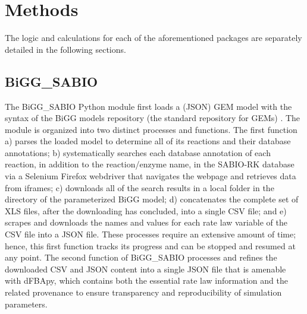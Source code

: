\section{Methods}
The logic and calculations for each of the aforementioned packages are separately detailed in the following sections.

\subsection{BiGG\_SABIO}

The BiGG\_SABIO Python module first loads a (JSON) GEM model with the syntax of the BiGG models repository (the standard repository for GEMs) \cite{King2016BiGGModels}. The module is organized into two distinct processes and functions. The first function  a) parses the loaded model to determine all of its reactions and their database annotations; b) systematically searches each database annotation of each reaction, in addition to the reaction/enzyme name, in the SABIO-RK database via a Selenium Firefox webdriver \cite{vandenBroucke2018PracticalScience,Nyamathulla2021APython} that navigates the webpage and retrieves data from iframes; c) downloads all of the search results in a local folder in the directory of the parameterized BiGG model; d) concatenates the complete set of XLS files, after the downloading has concluded, into a single CSV file; and e) scrapes and downloads the names and values for each rate law variable of the CSV file into a JSON file. These processes require an extensive amount of time; hence, this first function tracks its progress and can be stopped and resumed at any point. The second function of BiGG\_SABIO  processes and refines the downloaded CSV and JSON content into a single JSON file that is amenable with dFBApy, which contains both the essential rate law information and the related provenance to ensure transparency and reproducibility of simulation parameters. 

